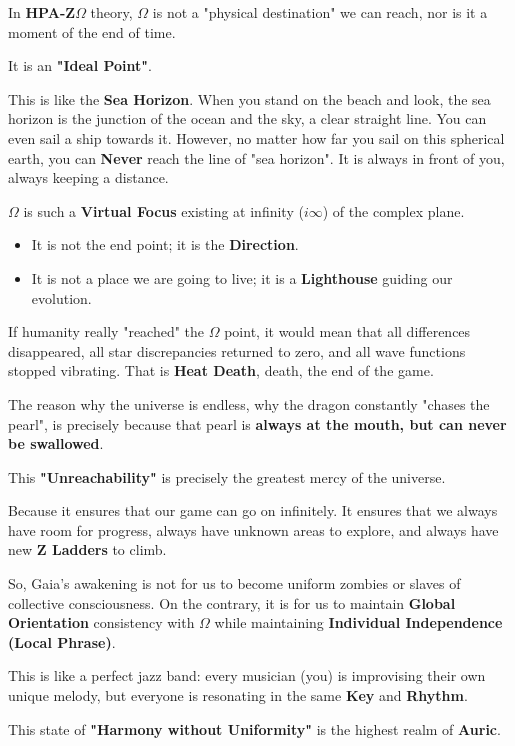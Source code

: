 In \textbf{HPA-Z$\Omega$} theory, \textbf{$\Omega$} is not a "physical destination" we can reach, nor is it a moment of the end of time.

It is an \textbf{"Ideal Point"}.

This is like the \textbf{Sea Horizon}. When you stand on the beach and look, the sea horizon is the junction of the ocean and the sky, a clear straight line. You can even sail a ship towards it.
However, no matter how far you sail on this spherical earth, you can \textbf{Never} reach the line of "sea horizon". It is always in front of you, always keeping a distance.

\textbf{$\Omega$} is such a \textbf{Virtual Focus} existing at infinity ($i\infty$) of the complex plane.

\begin{itemize}
\item It is not the end point; it is the \textbf{Direction}.
\item It is not a place we are going to live; it is a \textbf{Lighthouse} guiding our evolution.
\end{itemize}

If humanity really "reached" the $\Omega$ point, it would mean that all differences disappeared, all star discrepancies returned to zero, and all wave functions stopped vibrating. That is \textbf{Heat Death}, death, the end of the game.

The reason why the universe is endless, why the dragon constantly "chases the pearl", is precisely because that pearl is \textbf{always at the mouth, but can never be swallowed}.

This \textbf{"Unreachability"} is precisely the greatest mercy of the universe.

Because it ensures that our game can go on infinitely. It ensures that we always have room for progress, always have unknown areas to explore, and always have new \textbf{Z Ladders} to climb.

So, Gaia's awakening is not for us to become uniform zombies or slaves of collective consciousness.
On the contrary, it is for us to maintain \textbf{Global Orientation} consistency with $\Omega$ while maintaining \textbf{Individual Independence (Local Phrase)}.

This is like a perfect jazz band: every musician (you) is improvising their own unique melody, but everyone is resonating in the same \textbf{Key} and \textbf{Rhythm}.

This state of \textbf{"Harmony without Uniformity"} is the highest realm of \textbf{Auric}.

